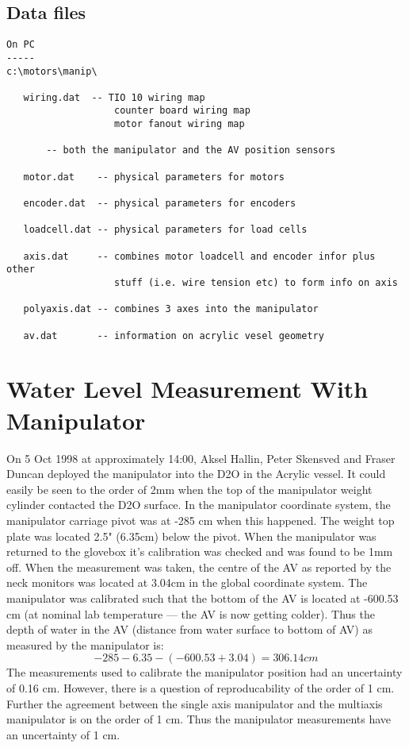 \section{Data files}
\begin{verbatim}
On PC
-----
c:\motors\manip\
  
   wiring.dat  -- TIO 10 wiring map
                   counter board wiring map
                   motor fanout wiring map
  
       -- both the manipulator and the AV position sensors
  
   motor.dat    -- physical parameters for motors
  
   encoder.dat  -- physical parameters for encoders
  
   loadcell.dat -- physical parameters for load cells
  
   axis.dat     -- combines motor loadcell and encoder infor plus other
                   stuff (i.e. wire tension etc) to form info on axis
  
   polyaxis.dat -- combines 3 axes into the manipulator
  
   av.dat       -- information on acrylic vesel geometry

\end{verbatim}
  


  
  
\chapter{Water Level Measurement With Manipulator}
  
  On 5 Oct 1998 at approximately 14:00, Aksel Hallin, Peter Skensved
and Fraser Duncan deployed the manipulator into the D2O in the Acrylic
vessel.  It could easily be seen to the order of 2mm when the top of
the manipulator weight cylinder contacted the D2O surface.  In the
manipulator coordinate system, the manipulator carriage pivot was at
 -285 cm when this happened.  The weight top plate was located 2.5"
(6.35cm) below the pivot.  When the manipulator was returned to the glovebox
it's calibration was checked and was found to be 1mm off.    When the
measurement was taken, the centre of the AV as reported by the neck monitors
was located at 3.04cm in the global coordinate system.  The manipulator
was calibrated such that the bottom of the AV is located at -600.53 cm
(at nominal lab temperature --- the AV is now getting colder).
Thus the depth of water in the AV (distance from water surface to bottom
of AV) as measured by the manipulator is:
\[  
    -285 - 6.35 - ( -600.53 + 3.04) = 306.14 cm
\] 
The measurements used to calibrate the manipulator position had an
uncertainty of 0.16 cm.  However, there is a question of reproducability
of the order of 1 cm.  Further the agreement between the single axis
manipulator and the multiaxis manipulator is on the order of 1 cm.
Thus the manipulator measurements have an uncertainty of 1 cm.
  
